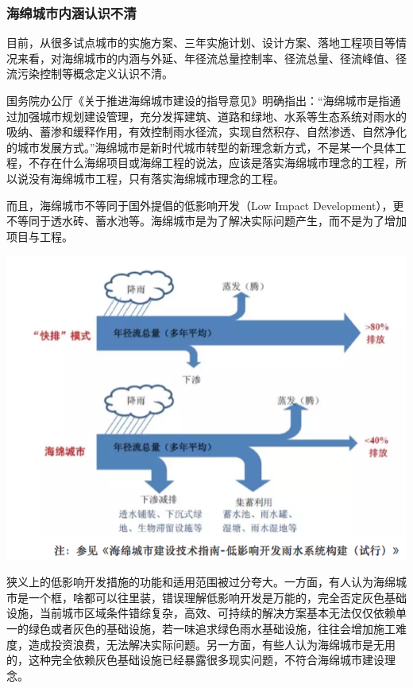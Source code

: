 \documentclass[]{book}
\begin{document}
\subsubsection{海绵城市内涵认识不清}

目前，从很多试点城市的实施方案、三年实施计划、设计方案、落地工程项目等情况来看，对海绵城市的内涵与外延、年径流总量控制率、径流总量、径流峰值、径流污染控制等概念定义认识不清。

国务院办公厅《关于推进海绵城市建设的指导意见》明确指出：``海绵城市是指通过加强城市规划建设管理，充分发挥建筑、道路和绿地、水系等生态系统对雨水的吸纳、蓄渗和缓释作用，有效控制雨水径流，实现自然积存、自然渗透、自然净化的城市发展方式。''海绵城市是新时代城市转型的新理念新方式，不是某一个具体工程，不存在什么海绵项目或海绵工程的说法，应该是落实海绵城市理念的工程，所以说没有海绵城市工程，只有落实海绵城市理念的工程。

而且，海绵城市不等同于国外提倡的低影响开发（Low Impact
Development），更不等同于透水砖、蓄水池等。海绵城市是为了解决实际问题产生，而不是为了增加项目与工程。

\includegraphics[width=8.33in]{images/hm2}

狭义上的低影响开发措施的功能和适用范围被过分夸大。一方面，有人认为海绵城市是一个框，啥都可以往里装，错误理解低影响开发是万能的，完全否定灰色基础设施，当前城市区域条件错综复杂，高效、可持续的解决方案基本无法仅仅依赖单一的绿色或者灰色的基础设施，若一味追求绿色雨水基础设施，往往会增加施工难度，造成投资浪费，无法解决实际问题。另一方面，有些人认为海绵城市是无用的，这种完全依赖灰色基础设施已经暴露很多现实问题，不符合海绵城市建设理念。
\end{document}
